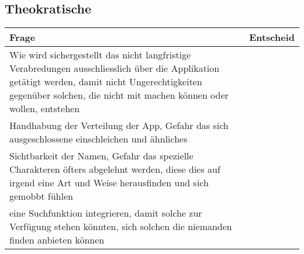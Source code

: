 \subsection{Theokratische}

\begin{tabularx}{\textwidth}{X|X}
Frage & Entscheid \\\hline
Wie wird sichergestellt das nicht langfristige Verabredungen ausschliesslich über die Applikation getätigt werden, damit nicht Ungerechtigkeiten gegenüber solchen, die nicht mit machen können oder wollen, entstehen & \\\hline
Handhabung der Verteilung der App, Gefahr das sich ausgeschlossene einschleichen und ähnliches & \\\hline
Sichtbarkeit der Namen, Gefahr das spezielle Charakteren öfters abgelehnt werden, diese dies auf irgend eine Art und Weise herausfinden und sich gemobbt fühlen & \\\hline
eine Suchfunktion integrieren, damit solche zur Verfügung stehen könnten, sich solchen die niemanden finden anbieten können & \\
\end{tabularx}

